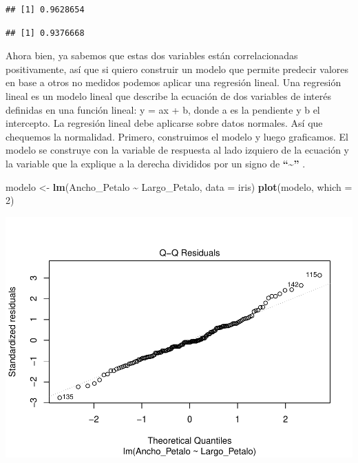 \documentclass[
]{book}
\newenvironment{Shaded}{\begin{snugshade}}{\end{snugshade}}
\newcommand{\AttributeTok}[1]{\textcolor[rgb]{0.13,0.29,0.53}{#1}}
\newcommand{\CommentTok}[1]{\textcolor[rgb]{0.56,0.35,0.01}{\textit{#1}}}
\newcommand{\DecValTok}[1]{\textcolor[rgb]{0.00,0.00,0.81}{#1}}
\newcommand{\FunctionTok}[1]{\textcolor[rgb]{0.13,0.29,0.53}{\textbf{#1}}}
\newcommand{\NormalTok}[1]{#1}
\newcommand{\OtherTok}[1]{\textcolor[rgb]{0.56,0.35,0.01}{#1}}
\newcommand{\SpecialCharTok}[1]{\textcolor[rgb]{0.81,0.36,0.00}{\textbf{#1}}}
\newcommand{\StringTok}[1]{\textcolor[rgb]{0.31,0.60,0.02}{#1}}
\begin{document}
\begin{verbatim}
## [1] 0.9628654
\end{verbatim}

\begin{Shaded}
\end{Shaded}

\begin{verbatim}
## [1] 0.9376668
\end{verbatim}

\hfill\break
Ahora bien, ya sabemos que estas dos variables están correlacionadas positivamente, así que si quiero construir un modelo que permite predecir valores en base a otros no medidos podemos aplicar una regresión lineal.
Una regresión lineal es un modelo lineal que describe la ecuación de dos variables de interés definidas en una función lineal: y = ax + b, donde a es la pendiente y b el intercepto.
La regresión lineal debe aplicarse sobre datos normales.
Así que chequemos la normalidad.
Primero, construimos el modelo y luego graficamos.
El modelo se construye con la variable de respuesta al lado izquiero de la ecuación y la variable que la explique a la derecha divididos por un signo de \textbf{``\textasciitilde{}''} .\\

\begin{Shaded}
\begin{Highlighting}[]
\NormalTok{modelo }\OtherTok{\textless{}{-}} \FunctionTok{lm}\NormalTok{(Ancho\_Petalo }\SpecialCharTok{\textasciitilde{}}\NormalTok{ Largo\_Petalo, }\AttributeTok{data =}\NormalTok{ iris) }
\FunctionTok{plot}\NormalTok{(modelo, }\AttributeTok{which =} \DecValTok{2}\NormalTok{)}
\end{Highlighting}
\end{Shaded}

\includegraphics{R_Manual_files/figure-latex/unnamed-chunk-253-1.pdf}
\end{document}
